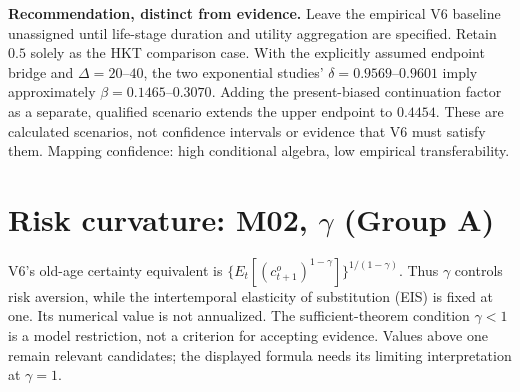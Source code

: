 \noindent\textbf{Recommendation, distinct from evidence.}
Leave the empirical V6 baseline unassigned until life-stage duration and utility
aggregation are specified. Retain $0.5$ solely as the HKT comparison case.
With the explicitly assumed endpoint bridge and $\Delta=20$--$40$, the two
exponential studies' $\delta=0.9569$--$0.9601$ imply approximately
$\beta=0.1465$--$0.3070$. Adding the present-biased continuation factor as a
separate, qualified scenario extends the upper endpoint to $0.4454$.
These are calculated scenarios, not confidence intervals or evidence that V6
must satisfy them. Mapping confidence: high conditional algebra, low empirical
transferability.

\clearpage
\section{Risk curvature: M02, $\gamma$ (Group A)}

V6's old-age certainty equivalent is
$\{E_t[(c_{t+1}^o)^{1-\gamma}]\}^{1/(1-\gamma)}$.
Thus $\gamma$ controls risk aversion, while the intertemporal elasticity of
substitution (EIS) is fixed at one. Its numerical value is not annualized.
The sufficient-theorem condition $\gamma<1$ is a model restriction, not a
criterion for accepting evidence. Values above one remain relevant candidates;
the displayed formula needs its limiting interpretation at $\gamma=1$.

